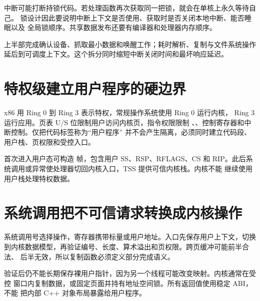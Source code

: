 中断可能打断持锁代码。若处理函数再次获取同一把锁，就会在单核上永久等待自己。
锁设计因此要说明中断上下文是否使用、获取时是否关闭本地中断、能否睡眠以及
全局锁顺序。共享数据发布还要有编译器和处理器内存顺序。

上半部完成确认设备、抓取最小数据和唤醒工作；耗时解析、复制与文件系统操作
延后到可调度上下文。这个拆分同时缩短中断关闭时间和最坏响应延迟。

\section{特权级建立用户程序的硬边界}

x86 用 Ring 0 到 Ring 3 表示特权，常规操作系统使用 Ring 0 运行内核，
Ring 3 运行应用。页表 U/S 位限制用户访问内核页，指令权限限制
、、控制寄存器和中断控制。仅把代码标签称为“用户程序”
并不会产生隔离，必须同时建立代码段、用户栈、页权限和受控入口。

首次进入用户态可构造  帧，包含用户 SS、RSP、RFLAGS、CS 和
RIP。此后系统调用或异常使处理器切回内核入口，TSS 提供可信内核栈。内核不能
继续使用用户栈处理特权数据。

\section{系统调用把不可信请求转换成内核操作}

系统调用号选择操作，寄存器携带标量或用户地址。入口先保存用户上下文，切换
到内核数据模型，再验证编号、长度、算术溢出和页权限。跨页缓冲可能前半合法、
后半无效，所以复制函数必须定义部分完成语义。

验证后仍不能长期保存裸用户指针，因为另一个线程可能改变映射。内核通常在受控
窗口内复制数据，或固定页面并持有地址空间锁。所有返回值使用稳定 ABI，不能
把内部 C++ 对象布局暴露给用户程序。
